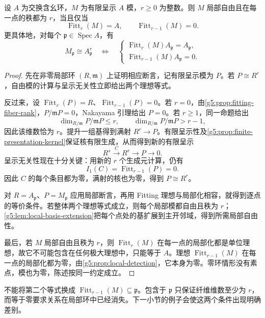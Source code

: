 \begin{theorem}\label{g5:thm:fitting-locally-free}
	设 \(A\) 为交换含幺环，\(M\) 为有限呈示 \(A\) 模，\(r\geq0\) 为整数。则 \(M\) 局部自由且在每一点的秩都为 \(r\)，当且仅当
	\[
		\operatorname{Fitt}_r(M)=A,
		\qquad\operatorname{Fitt}_{r-1}(M)=0.
	\]
	更具体地，对每个 \(\mathfrak p\in\operatorname{Spec}A\)，有
	\[
		M_{\mathfrak p}\cong A_{\mathfrak p}^r
		\quad\Longleftrightarrow\quad
		\begin{cases}
			\operatorname{Fitt}_r(M)A_{\mathfrak p}=A_{\mathfrak p},\\
			\operatorname{Fitt}_{r-1}(M)A_{\mathfrak p}=0.
		\end{cases}
	\]
\end{theorem}
\begin{proof}
	先在非零局部环 \((R,\mathfrak m)\) 上证明相应断言，记有限呈示模为 \(P\)。若 \(P\cong R^r\)，自由模的计算与呈示无关性立即给出两个理想等式。

	反过来，设 \(\operatorname{Fitt}_r(P)=R\)、\(\operatorname{Fitt}_{r-1}(P)=0\)。若 \(r=0\)，由\cref{g5:prop:fitting-fiber-rank}，\(P/\mathfrak mP=0\)，Nakayama 引理给出 \(P=0\)。若 \(r\geq1\)，同一命题给出
	\[
		\dim_{R/\mathfrak m}P/\mathfrak mP\leq r,
		\qquad\dim_{R/\mathfrak m}P/\mathfrak mP>r-1,
	\]
	因此该维数恰为 \(r\)。提升一组基得到满射 \(R^r\to P\)。有限呈示性及\cref{g5:prop:finite-presentation-kernel}保证核有限生成，从而得到新的有限呈示
	\[
		R^s\xrightarrow{C}R^r\longrightarrow P\longrightarrow0.
	\]
	呈示无关性现在十分关键：用新的 \(r\) 个生成元计算，仍有
	\[
		I_1(C)=\operatorname{Fitt}_{r-1}(P)=0.
	\]
	因此 \(C\) 的每个条目都为零，满射的核也为零，得到 \(P\cong R^r\)。

	对 \(R=A_{\mathfrak p}\)、\(P=M_{\mathfrak p}\) 应用局部断言，再用 Fitting 理想与局部化相容，就得到逐点的等价条件。若整体两个理想等式成立，则每个局部模都自由且秩为 \(r\)；\cref{g5:lem:local-basis-extension}把每个点处的基扩展到主开邻域，得到所需局部自由性。

	最后，若 \(M\) 局部自由且秩为 \(r\)，则 \(\operatorname{Fitt}_r(M)\) 在每一点的局部化都是单位理想，故它不可能包含在任何极大理想中，只能等于 \(A\)。理想 \(\operatorname{Fitt}_{r-1}(M)\) 在每一点的局部化都为零，由\cref{g5:prop:local-detection}，它本身为零。零环情形没有素点，模也为零，陈述按同一约定成立。
\end{proof}

不能将第二个等式换成 \(\operatorname{Fitt}_{r-1}(M)\subseteq\mathfrak p\)。包含于 \(\mathfrak p\) 只保证纤维维数至少为 \(r\)，而等于零要求关系在局部环中已经消失。下一小节的例子会使这两个条件出现明确差别。

